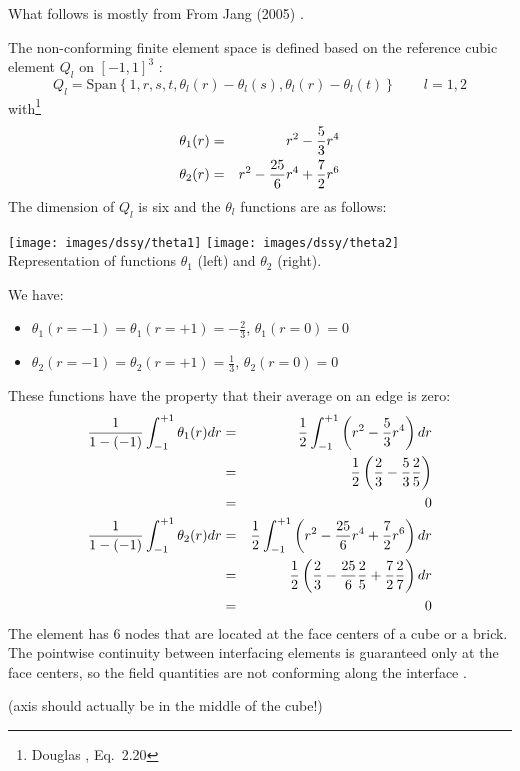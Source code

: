 What follows is mostly from From Jang \etal (2005) \cite{jalk05}.

The non-conforming finite element space is defined based on the 
reference cubic element $Q_l$ on $[-1,1]^3$ :
\[
Q_l = \text{Span} \left\{ 1, r, s, t, \theta_l(r)-\theta_l(s), \theta_l(r)-\theta_l(t) \right\}
\qquad l=1,2
\]
with\footnote{Douglas \etal \cite{doss99}, Eq.~2.20} 
\begin{eqnarray}
\theta_1(r) &=& r^2-\frac53r^4  \nonumber\\
\theta_2(r) &=& r^2-\frac{25}{6} r^4 + \frac72 r^6 
\end{eqnarray}
The dimension of $Q_l$ is six and the $\theta_l$ functions are as follows:
\begin{center}
\texttt{[image: images/dssy/theta1]}
\texttt{[image: images/dssy/theta2]}\\
{\captionfont Representation of functions $\theta_1$ (left) and 
$\theta_2$ (right).} 
\end{center}
We have:
\begin{itemize}
\item $\theta_1(r=-1)=\theta_1(r=+1)=-\frac23$, $\theta_1(r=0)=0$ 
\item $\theta_2(r=-1)=\theta_2(r=+1)=\frac13$, $\theta_2(r=0)=0$ 
\end{itemize}
These functions have the property that their average on an edge is zero:
\begin{eqnarray}
\frac{1}{1-(-1)}\int_{-1}^{+1} \theta_1(r) dr 
&=& \frac{1}{2}\int_{-1}^{+1} \left( r^2-\frac53r^4  \right) dr \nonumber\\
&=& \frac12 \left( \frac23 - \frac53 \frac25 \right) \nonumber\\
&=& 0 \nonumber\\
\frac{1}{1-(-1)}\int_{-1}^{+1} \theta_2(r) dr 
&=& \frac{1}{2}\int_{-1}^{+1} \left( r^2-\frac{25}{6} r^4 + \frac72 r^6  \right) dr \nonumber\\
&=& \frac{1}{2} \left( \frac23 -\frac{25}{6} \frac25 + \frac72 \frac{2}{7}  \right) dr \nonumber\\
&=& 0 \nonumber
\end{eqnarray}
The element has 6 nodes that are located at the face centers of a cube or a brick.
The pointwise continuity between interfacing elements is guaranteed only at the face centers,
so the field quantities are not conforming along the interface \cite{jalk05}.



(axis should actually be in the middle of the cube!)


